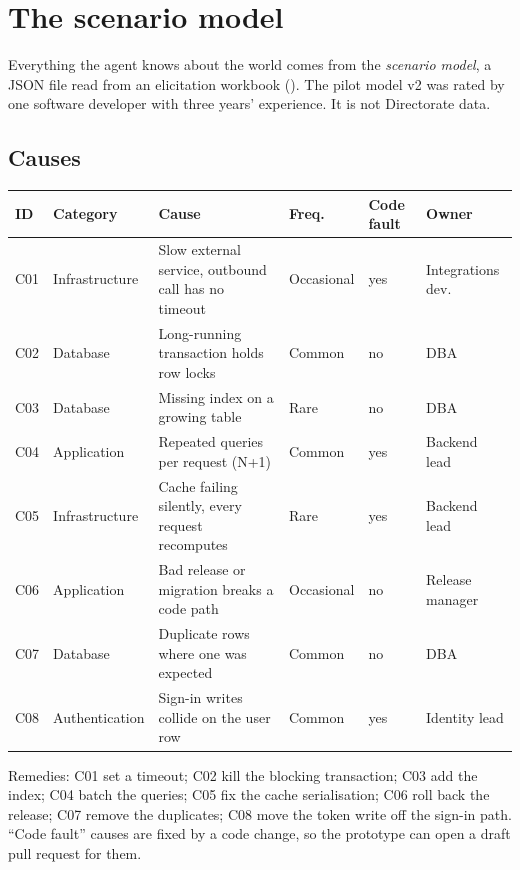 \documentclass[11pt,a4paper]{article}
\newcommand{\file}[1]{{\small\path{#1}}}
\begin{document}
\section{The scenario model}\label{sec:model}

Everything the agent knows about the world comes from the \emph{scenario model}, a JSON file
read from an elicitation workbook (\file{src/sim/load_model.py}). The pilot model v2 was rated by
one software developer with three years' experience. It is not Directorate data.

\subsection{Causes}

\begin{center}\small
\begin{tabularx}{\linewidth}{@{}llLlll@{}}
\toprule
ID & Category & Cause & Freq. & Code fault & Owner \\
\midrule
C01 & Infrastructure & Slow external service, outbound call has no timeout & Occasional & yes & Integrations dev. \\
C02 & Database & Long-running transaction holds row locks & Common & no & DBA \\
C03 & Database & Missing index on a growing table & Rare & no & DBA \\
C04 & Application & Repeated queries per request (N+1) & Common & yes & Backend lead \\
C05 & Infrastructure & Cache failing silently, every request recomputes & Rare & yes & Backend lead \\
C06 & Application & Bad release or migration breaks a code path & Occasional & no & Release manager \\
C07 & Database & Duplicate rows where one was expected & Common & no & DBA \\
C08 & Authentication & Sign-in writes collide on the user row & Common & yes & Identity lead \\
\bottomrule
\end{tabularx}
\end{center}
Remedies: C01 set a timeout; C02 kill the blocking transaction; C03 add the index; C04 batch the
queries; C05 fix the cache serialisation; C06 roll back the release; C07 remove the duplicates;
C08 move the token write off the sign-in path. ``Code fault'' causes are fixed by a code change,
so the prototype can open a draft pull request for them.
\end{document}
